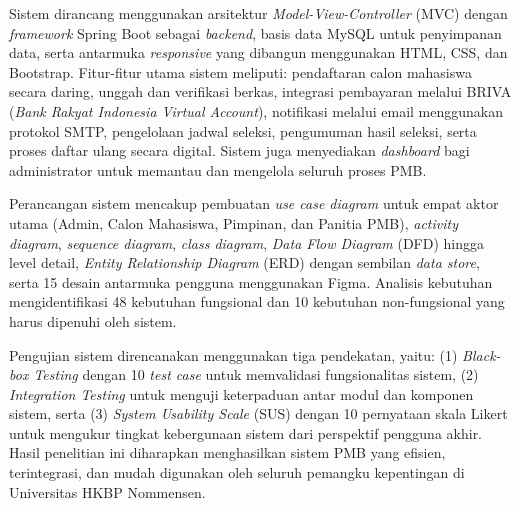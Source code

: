\begin{center}
	Sistem dirancang menggunakan arsitektur \textit{Model-View-Controller} (MVC) dengan \textit{framework} Spring Boot sebagai \textit{backend}, basis data MySQL untuk penyimpanan data, serta antarmuka \textit{responsive} yang dibangun menggunakan HTML, CSS, dan Bootstrap. Fitur-fitur utama sistem meliputi: pendaftaran calon mahasiswa secara daring, unggah dan verifikasi berkas, integrasi pembayaran melalui BRIVA (\textit{Bank Rakyat Indonesia Virtual Account}), notifikasi melalui email menggunakan protokol SMTP, pengelolaan jadwal seleksi, pengumuman hasil seleksi, serta proses daftar ulang secara digital. Sistem juga menyediakan \textit{dashboard} bagi administrator untuk memantau dan mengelola seluruh proses PMB.\par

	Perancangan sistem mencakup pembuatan \textit{use case diagram} untuk empat aktor utama (Admin, Calon Mahasiswa, Pimpinan, dan Panitia PMB), \textit{activity diagram}, \textit{sequence diagram}, \textit{class diagram}, \textit{Data Flow Diagram} (DFD) hingga level detail, \textit{Entity Relationship Diagram} (ERD) dengan sembilan \textit{data store}, serta 15 desain antarmuka pengguna menggunakan Figma. Analisis kebutuhan mengidentifikasi 48 kebutuhan fungsional dan 10 kebutuhan non-fungsional yang harus dipenuhi oleh sistem.\par

	Pengujian sistem direncanakan menggunakan tiga pendekatan, yaitu: (1) \textit{Black-box Testing} dengan 10 \textit{test case} untuk memvalidasi fungsionalitas sistem, (2) \textit{Integration Testing} untuk menguji keterpaduan antar modul dan komponen sistem, serta (3) \textit{System Usability Scale} (SUS) dengan 10 pernyataan skala Likert untuk mengukur tingkat kebergunaan sistem dari perspektif pengguna akhir. Hasil penelitian ini diharapkan menghasilkan sistem PMB yang efisien, terintegrasi, dan mudah digunakan oleh seluruh pemangku kepentingan di Universitas HKBP Nommensen.\par

	\vfill
	
\end{center}
\clearpage
